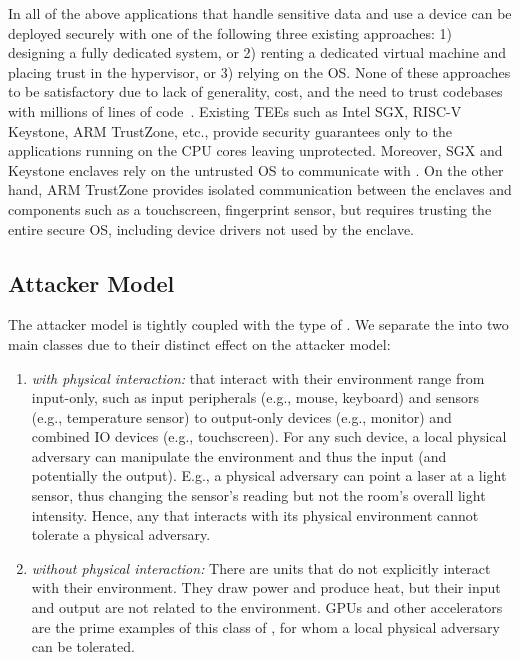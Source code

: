 In all of the above applications that handle sensitive data and use a \sphw device can be deployed securely with one of the following three existing approaches: 1) designing a fully dedicated system, or 2) renting a dedicated virtual machine and placing trust in the hypervisor, or 3) relying on the OS. None of these approaches to be satisfactory due to lack of generality, cost, and the need to trust codebases with millions of lines of code~\cite{torvalds2020linux,barham2003xen}. Existing TEEs such as Intel SGX, RISC-V Keystone, ARM TrustZone, etc., provide security guarantees only to the applications running on the CPU cores leaving \sphw unprotected. Moreover, SGX and Keystone enclaves rely on the untrusted OS to communicate with \sphw. On the other hand, ARM TrustZone provides isolated communication between the enclaves and components such as a touchscreen, fingerprint sensor, but requires trusting the entire secure OS, including device drivers not used by the enclave. 


\subsection{Attacker Model}
\label{pie:sec:problemStatement:attackerModel}

The attacker model is tightly coupled with the type of \sphw. We separate the \sphw into two main classes due to their distinct effect on the attacker model: 

\begin{enumerate}
\item \emph{\Sphw with physical interaction:}
\Sphw that interact with their environment range from input-only, such as input peripherals (e.g., mouse, keyboard) and sensors (e.g., temperature sensor) to output-only devices (e.g., monitor) and combined IO devices (e.g., touchscreen). For any such device, a local physical adversary can manipulate the environment and thus the input (and potentially the output). E.g., a physical adversary can point a laser at a light sensor, thus changing the sensor's reading but not the room's overall light intensity. Hence, any \sphw that interacts with its physical environment cannot tolerate a physical adversary.

\item \emph{\Sphw without physical interaction:}
There are \sphw units that do not explicitly interact with their environment. They draw power and produce heat, but their input and output are not related to the environment. GPUs and other accelerators are the prime examples of this class of \sphw, for whom a local physical adversary can be tolerated. 
\end{enumerate}

